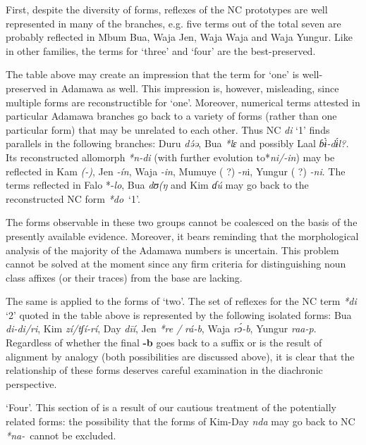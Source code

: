 First, despite the diversity of forms, reflexes of the NC prototypes are well represented in many of the branches, e.g. five terms out of the total seven are probably reflected in Mbum Bua, Waja Jen, Waja Waja and Waja Yungur. Like in other families, the terms for ‘three’ and ‘four’ are the best-preserved.

The table above may create an impression that the term for ‘one’ is well-preserved in Adamawa as well. This impression is, however, misleading, since multiple forms are reconstructible for ‘one’. Moreover, numerical terms attested in particular Adamawa branches go back to a variety of forms (rather than one particular form) that may be unrelated to each other. Thus NC \textit{di} ‘1’ finds parallels in the following branches: Duru \textit{d{\'{ə}}ə}, Bua \textit{*lɛ} and possibly Laal \textit{ɓ{\`{ɨ}}-d{\'{ɨ}}l?.} Its reconstructed allomorph \textit{*n-di} (with further evolution to*\textit{ni/-in}) may be reflected in Kam \textit{(-{}{})}, Jen \textit{-ín}, Waja \textit{-in}, Mumuye ( ?) -\textit{n}i, Yungur ( ?) \textit{-ni}. The terms reflected in Falo *-\textit{lo}, Bua \textit{dʊ(ŋ} and Kim \textit{ɗú} may go back to the reconstructed NC form \textit{*do}~‘1’.

The forms observable in these two groups cannot be coalesced on the basis of the presently available evidence. Moreover, it bears reminding that the morphological analysis of the majority of the Adamawa numbers is uncertain. This problem cannot be solved at the moment since any firm criteria for distinguishing noun class affixes (or their traces) from the base are lacking. 

The same is applied to the forms of ‘two’. The set of reflexes for the NC term \textit{*di} ‘2’ quoted in the table above is represented by the following isolated forms: Bua \textit{di-di/ri}, Kim \textit{zí/tʃí-rí}, Day \textit{dīí}, Jen \textit{*re /}  \textit{rá-b}, Waja \textit{r{\'{ɔ}}-b}, Yungur \textit{raa-p}. Regardless of whether the final \textbf{-b} goes back to a suffix or is the result of alignment by analogy (both possibilities are discussed above), it is clear that the relationship of these forms deserves careful examination in the diachronic perspective.

‘Four’. This section of  is a result of our cautious treatment of the potentially related forms: the possibility that the forms of Kim-Day \textit{nda} may go back to NC \textit{*na}\textit{-}~cannot be excluded.

